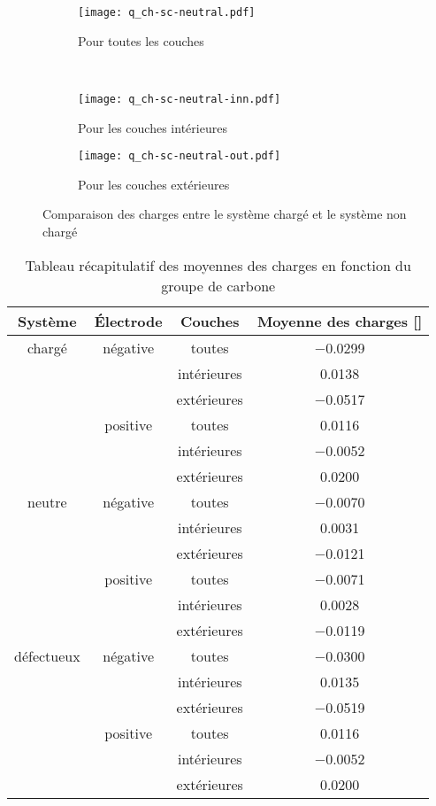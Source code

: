 \begin{figure}[h!]
    \centering
    \begin{subfigure}[t]{.49 \textwidth}
        \centering
        \texttt{[image: q\_ch-sc-neutral.pdf]}
        \caption{Pour toutes les couches}
    \end{subfigure}%
    ~
    \begin{subfigure}[t]{.49 \textwidth}
        \centering
        \texttt{[image: q\_ch-sc-neutral-inn.pdf]}
        \caption{Pour les couches intérieures}
    \end{subfigure}

    \begin{subfigure}[t]{.49 \textwidth}
        \centering
        \texttt{[image: q\_ch-sc-neutral-out.pdf]}
        \caption{Pour les couches extérieures}
    \end{subfigure}
    \caption{Comparaison des charges entre le système chargé et le système non chargé}
    \label{fig:comparaison_ch-sc-neutral}
\end{figure}

\begin{table}[h!]
    \centering
    \begin{tabular}{c | c | c || c}
        \hline
        Système &Électrode &Couches &Moyenne des charges [\unit{\e}]\\
        \hline
        chargé &négative &toutes &\num{-0.0299}\\
         & &intérieures &\num{0.0138}\\
         & &extérieures &\num{-0.0517}\\
         &positive &toutes &\num{0.0116}\\
         & &intérieures &\num{-0.0052}\\
         & &extérieures &\num{0.0200}\\
        \hline
        neutre &négative &toutes &\num{-0.0070}\\
         & &intérieures &\num{0.0031}\\
         & &extérieures &\num{-0.0121}\\
        &positive &toutes &\num{-0.0071}\\
         & &intérieures &\num{0.0028}\\
         & &extérieures &\num{-0.0119}\\ 
        \hline
        défectueux &négative &toutes &\num{-0.0300}\\
         & &intérieures &\num{0.0135}\\
         & &extérieures &\num{-0.0519}\\
         &positive &toutes &\num{0.0116}\\
         & &intérieures &\num{-0.0052}\\
         & &extérieures &\num{0.0200}\\
        \hline
    \end{tabular}
    \caption{Tableau récapitulatif des moyennes des charges en fonction du groupe de carbone}
    \label{tab:comparaison_charges}
\end{table}

